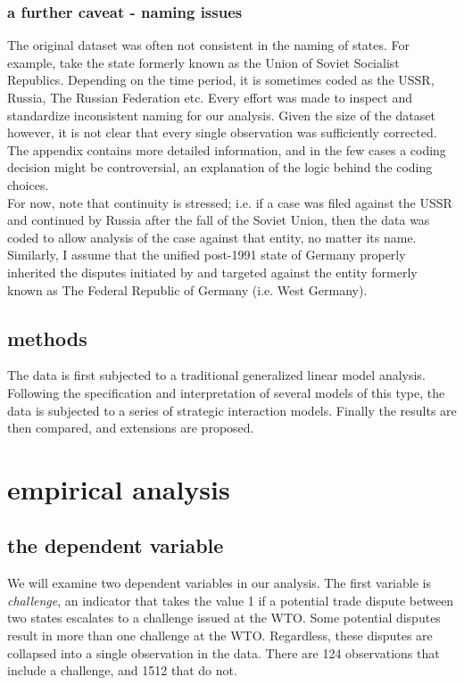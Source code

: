 \documentclass[]{article}
\begin{document}
\subsubsection{a further caveat - naming issues}
The original dataset was often not consistent in the naming of states. For example, take the state formerly known as the Union of Soviet Socialist Republics. Depending on the time period, it is sometimes coded as the USSR, Russia, The Russian Federation etc. Every effort was made to inspect and standardize inconsistent naming for our analysis.  Given the size of the dataset however, it is not clear that every single observation was sufficiently corrected. The appendix contains more detailed information, and in the few cases a coding decision might be controversial, an explanation of the logic behind the coding choices. \\

For now, note that continuity is stressed; i.e. if a case was filed against the USSR and continued by Russia after the fall of the Soviet Union, then the data was coded to allow analysis of the case against that entity, no matter its name. Similarly, I assume that the unified post-1991 state of Germany properly inherited the disputes initiated by and targeted against the entity formerly known as The Federal Republic of Germany (i.e. West Germany).

\subsection{methods}
The data is first subjected to a traditional generalized linear model analysis. Following the specification and interpretation of several models of this type, the data is subjected to a series of strategic interaction models. Finally the results are then compared, and extensions are proposed. 

\section{empirical analysis}
\subsection{the dependent variable}
We will examine two dependent variables in our analysis. The first variable is \textit{challenge}, an indicator that takes the value 1 if a potential trade dispute between two states escalates to a challenge issued at the WTO. Some potential disputes result in more than one challenge at the WTO. Regardless, these disputes are collapsed into a single observation in the data. There are 124 observations that include a challenge, and 1512 that do not.  \\
\end{document}

